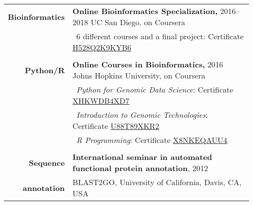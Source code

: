 \documentclass[letterpaper,10pt]{article}
\begin{document}
\begin{tabular}{r|p{13.5cm}}

\textbf{Bioinformatics}
& \textbf{Online Bioinformatics Specialization,} 2016--2018
  \hspace{1mm} \small{UC San Diego, on Coursera} \\
& \textbullet{}~6 different courses and a final project: \hspace{0.5mm}
  Certificate
  \href{https://www.coursera.org/account/accomplishments/specialization/H528Q2K9KYB6}
  {H528Q2K9KYB6} \\

\multicolumn{2}{c}{} \\

\textbf{Python/R}
& \textbf{Online Courses in Bioinformatics,} 2016
  \hspace{1mm} \small{Johns Hopkins University, on Coursera} \\
& \textbullet{}~\emph{Python for Genomic Data Science}: \hspace{0.5mm}
  Certificate
  \href{https://www.coursera.org/account/accomplishments/verify/XHKWDB4XD7}
  {XHKWDB4XD7} \\
& \textbullet{}~\emph{Introduction to Genomic Technologies}: \hspace{0.5mm}
  Certificate
  \href{https://www.coursera.org/account/accomplishments/verify/U88T89XKR2}
  {U88T89XKR2} \\
& \textbullet{}~\emph{R Programming}: \hspace{0.5mm}
  Certificate
  \href{https://www.coursera.org/account/accomplishments/verify/X8NKEQAUU4}
  {X8NKEQAUU4} \\

\multicolumn{2}{c}{} \\

\textbf{Sequence}
& \textbf{International seminar in automated functional protein annotation}, 2012 \\
\textbf{annotation}
& BLAST2GO, University of California, Davis, CA, USA \\

\end{tabular}

\bigskip
\bigskip

\end{document}
